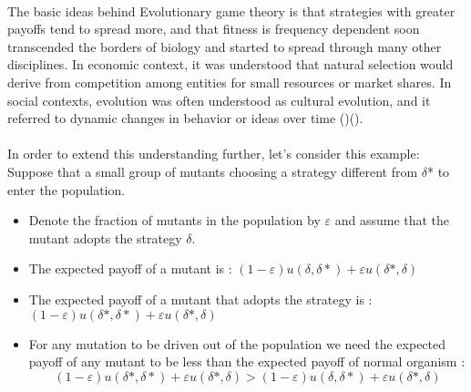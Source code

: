 \paragraph{}The basic ideas behind Evolutionary game theory is that strategies with greater payoffs tend to spread more, and that fitness is frequency dependent soon transcended the borders of biology and started to spread through many other disciplines. In economic context, it was understood that natural selection would derive from competition among entities for small resources or market shares. In social contexts, evolution was often understood as cultural evolution, and it referred to dynamic changes in behavior or ideas over time (\cite{Nelson and Winter, 1982})(\cite{Boyd and Richerson, 1985}).
\paragraph{}In order to extend this understanding further, let's consider this example:
Suppose that a small group of mutants choosing a strategy different from $\delta$* to enter the population.
\begin{itemize}
\item Denote the fraction of mutants in the population by $\varepsilon$ and assume that the mutant adopts the strategy $\delta$.
\item The expected payoff of a mutant is : 
	$(1-\varepsilon)u(\delta,\delta*)+\varepsilon u(\delta*,\delta)$
\item The expected payoff of a mutant that adopts the strategy is :	\\
	$(1-\varepsilon)u(\delta*,\delta*)+\varepsilon u(\delta*,\delta)$
	\item For any mutation to be driven out of the population we need the expected payoff of any mutant to be less than the expected payoff of normal organism :\\
	\begin{equation}(1-\varepsilon)u(\delta*,\delta*)+\varepsilon u(\delta*,\delta) > (1-\varepsilon)u(\delta,\delta*)+\varepsilon u(\delta*,\delta)  \end{equation}
\end{itemize}

